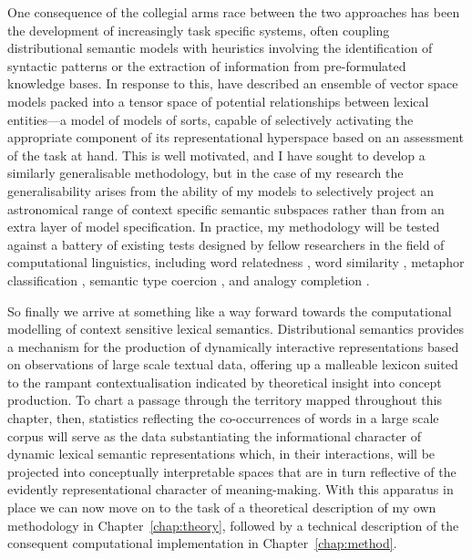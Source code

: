 One consequence of the collegial arms race between the two approaches has been the development of increasingly task specific systems, often coupling distributional semantic models with heuristics involving the identification of syntactic patterns or the extraction of information from pre-formulated knowledge bases.  In response to this, \cite{BaroniEA2010b} have described an ensemble of vector space models packed into a tensor space of potential relationships between lexical entities---a model of models of sorts, capable of selectively activating the appropriate component of its representational hyperspace based on an assessment of the task at hand.  This is well motivated, and I have sought to develop a similarly generalisable methodology, but in the case of my research the generalisability arises from the ability of my models to selectively project an astronomical range of context specific semantic subspaces rather than from an extra layer of model specification.  In practice, my methodology will be tested against a battery of existing tests designed by fellow researchers in the field of computational linguistics, including word relatedness \citep{FinkelsteinEA2002}, word similarity \citep{HillEA2015}, metaphor classification \citep{GutierrezEA2016}, semantic type coercion \citep{PustejovskyEA2010}, and analogy completion \citep{MikolovEA2013}.

So finally we arrive at something like a way forward towards the computational modelling of context sensitive lexical semantics.  Distributional semantics provides a mechanism for the production of dynamically interactive representations based on observations of large scale textual data, offering up a malleable lexicon suited to the rampant contextualisation indicated by theoretical insight into concept production.  To chart a passage through the territory mapped throughout this chapter, then, statistics reflecting the co-occurrences of words in a large scale corpus will serve as the data substantiating the informational character of dynamic lexical semantic representations which, in their interactions, will be projected into conceptually interpretable spaces that are in turn reflective of the evidently representational character of meaning-making.  With this apparatus in place we can now move on to the task of a theoretical description of my own methodology in Chapter~\ref{chap:theory}, followed by a technical description of the consequent computational implementation in Chapter~\ref{chap:method}.

